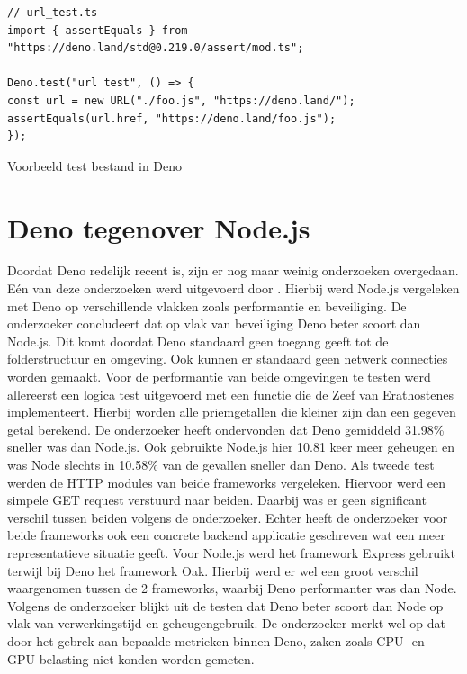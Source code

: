 \begin{listing}[H]
    \centering
    \begin{verbatim}
// url_test.ts
import { assertEquals } from "https://deno.land/std@0.219.0/assert/mod.ts";

Deno.test("url test", () => {
const url = new URL("./foo.js", "https://deno.land/");
assertEquals(url.href, "https://deno.land/foo.js");
});
        \end{verbatim}
        \caption[Deno test]{\label{list:test}Voorbeeld test bestand in Deno ~\autocite{DenoLand2023}} 
\end{listing}

\section{Deno tegenover Node.js}
Doordat Deno redelijk recent is, zijn er nog maar weinig onderzoeken overgedaan. 
Eén van deze onderzoeken werd uitgevoerd door \textcite{VanKerkvoorde2021}.
Hierbij werd Node.js vergeleken met Deno op verschillende vlakken zoals performantie en beveiliging.
De onderzoeker concludeert dat op vlak van beveiliging Deno beter scoort dan Node.js. Dit komt doordat Deno
standaard geen toegang geeft tot de folderstructuur en omgeving. Ook kunnen er standaard geen netwerk connecties worden gemaakt.
Voor de performantie van beide omgevingen te testen werd allereerst een logica test
uitgevoerd met een functie die de Zeef van Erathostenes implementeert. 
Hierbij worden alle priemgetallen die kleiner zijn dan een gegeven getal berekend. De onderzoeker heeft
ondervonden dat Deno gemiddeld 31.98\% sneller
was dan Node.js. Ook gebruikte Node.js hier 10.81 keer meer geheugen en was Node slechts in 10.58\% van de gevallen sneller dan Deno.
Als tweede test werden de HTTP modules van beide frameworks vergeleken.
Hiervoor werd een simpele GET request verstuurd naar beiden. Daarbij was er geen significant
verschil tussen beiden volgens de onderzoeker.
Echter heeft de onderzoeker voor beide frameworks ook een concrete backend applicatie geschreven wat een meer representatieve situatie geeft.
Voor Node.js werd het framework Express gebruikt terwijl bij Deno het framework Oak. Hierbij werd er wel een groot
verschil waargenomen tussen de 2 frameworks, waarbij Deno performanter was dan Node. Volgens de onderzoeker blijkt uit de testen dat Deno
beter scoort dan Node op vlak van verwerkingstijd en geheugengebruik. De onderzoeker merkt
wel op dat door het gebrek aan bepaalde metrieken binnen Deno, zaken zoals CPU- en GPU-belasting niet konden worden gemeten.


